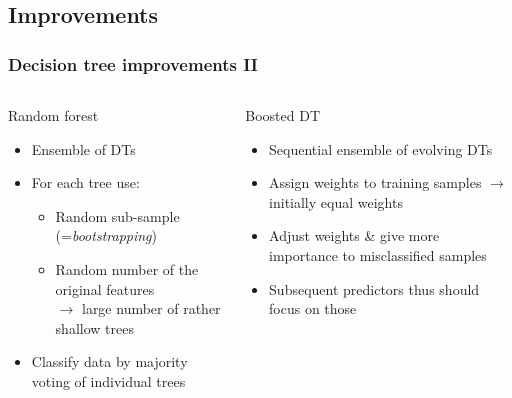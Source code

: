 \documentclass{beamer}
\begin{document}

\subsection{Improvements}
\begin{frame}
    \frametitle{Decision tree improvements II}
    \begin{columns}[T] %
        \begin{column}{.48\textwidth}
            \begin{block}{Random forest}
                \begin{itemize}
                    \item<1-> Ensemble of DTs
                    \item<2-> For each tree use:
                    \begin{itemize}
                        \item<3-> Random sub-sample (=\emph{bootstrapping})
                        \item<4-> Random number of the original features\\
                                  $\to$ large number of rather shallow trees
                    \end{itemize}
                    \item<5-> Classify data by majority voting of individual trees
                \end{itemize}
            \end{block}
        \end{column}%
        \hfill%
        \begin{column}{.48\textwidth}
            \begin{block}{Boosted DT}
                \begin{itemize}
                    \item<6-> Sequential ensemble of evolving DTs
                    \item<7-> Assign weights to training samples $\to$ initially equal weights
                    \item<8-> Adjust weights \& give more importance to misclassified samples
                    \item<9-> Subsequent predictors thus should focus on those 
                \end{itemize}
            \end{block}            
        \end{column}%
    \end{columns}

\end{frame}
\end{document}
